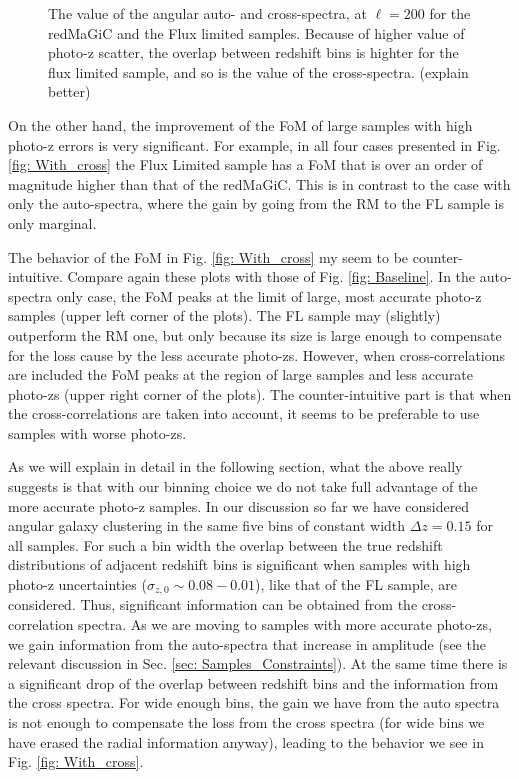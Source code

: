 \documentclass[a4paper,fleqn,usenatbib]{mnras}
\begin{document}
\begin{figure}
\centering
{}

\caption{The value of the angular auto- and cross-spectra, at $\ell =200$ for the redMaGiC and the Flux limited samples. Because of higher value of photo-z scatter, the overlap between redshift bins is highter for the flux limited sample, and so is the value of the cross-spectra. (explain better) }
\label{fig: Importance}
\end{figure}

On the other hand, the improvement of the FoM of large samples with high photo-z errors is very significant. For example, in all four cases presented in Fig. \ref{fig: With_cross}  the Flux Limited sample has a FoM that is over an order of magnitude higher than that of the redMaGiC. This is in contrast to the case with only the auto-spectra, where the gain by going from the RM to the FL sample is only marginal.

The behavior of the FoM in Fig. \ref{fig: With_cross} my seem to be counter-intuitive. Compare again these plots with those of Fig. \ref{fig: Baseline}. In the auto-spectra only case, the FoM peaks at the limit of large, most accurate photo-z samples (upper left corner of the plots). The FL sample may (slightly) outperform the RM one, but only because its size is large enough to compensate for the loss cause by the less accurate photo-zs. However, when cross-correlations are included the FoM peaks at the region of large samples and less accurate photo-zs (upper right corner of the plots). The counter-intuitive part is that when the cross-correlations are taken into account, it seems to be preferable to use  samples with worse photo-zs.

As we will explain in detail in the following section, what the above really suggests is that with our binning choice we do not take full advantage of the more accurate photo-z samples. In our discussion so far we have considered angular galaxy clustering in the same five bins of constant width $\Delta z = 0.15$ for all samples. For such a bin width the overlap between the true redshift distributions of adjacent  redshift bins is significant when samples with high photo-z uncertainties ($\sigma_{z,0} \sim 0.08-0.01$), like that of the FL sample, are considered. Thus, significant information can be  obtained from the cross-correlation spectra. As we are moving to samples with more accurate photo-zs, we gain information from the auto-spectra that increase in amplitude (see the relevant discussion in Sec. \ref{sec: Samples_Constraints}). At the same time there is a significant drop of the overlap between redshift bins and the information from the cross spectra. For wide enough bins, the gain we have from the auto spectra is not enough to compensate the loss from the cross spectra (for wide bins we have erased the radial information anyway), leading to the behavior we see in Fig. \ref{fig: With_cross}.
\end{document}
